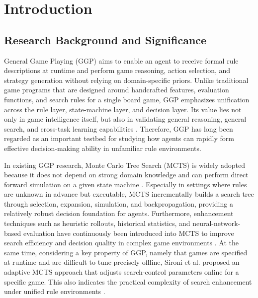 ﻿%
\chapter{Introduction}
\setcounter{figure}{0}
\setcounter{equation}{0}
\renewcommand{\thefigure}{\thechapter-\arabic{figure}}
\renewcommand{\theequation}{\thechapter-\arabic{equation}}

\section{Research Background and Significance}

General Game Playing (GGP) aims to enable an agent to receive formal rule descriptions at runtime and perform game reasoning, action selection, and strategy generation without relying on domain-specific priors. Unlike traditional game programs that are designed around handcrafted features, evaluation functions, and search rules for a single board game, GGP emphasizes unification across the rule layer, state-machine layer, and decision layer. Its value lies not only in game intelligence itself, but also in validating general reasoning, general search, and cross-task learning capabilities \cite{genesereth2005general,genesereth2026general}. Therefore, GGP has long been regarded as an important testbed for studying how agents can rapidly form effective decision-making ability in unfamiliar rule environments.

In existing GGP research, Monte Carlo Tree Search (MCTS) is widely adopted because it does not depend on strong domain knowledge and can perform direct forward simulation on a given state machine \cite{browne2012survey}. Especially in settings where rules are unknown in advance but executable, MCTS incrementally builds a search tree through selection, expansion, simulation, and backpropagation, providing a relatively robust decision foundation for agents. Furthermore, enhancement techniques such as heuristic rollouts, historical statistics, and neural-network-based evaluation have continuously been introduced into MCTS to improve search efficiency and decision quality in complex game environments \cite{finnsson2008simulation,anthony2017thinking,silver2018general}. At the same time, considering a key property of GGP, namely that games are specified at runtime and are difficult to tune precisely offline, Sironi et al. proposed an adaptive MCTS approach that adjusts search-control parameters online for a specific game. This also indicates the practical complexity of search enhancement under unified rule environments \cite{sironi2020selfadaptive}.

